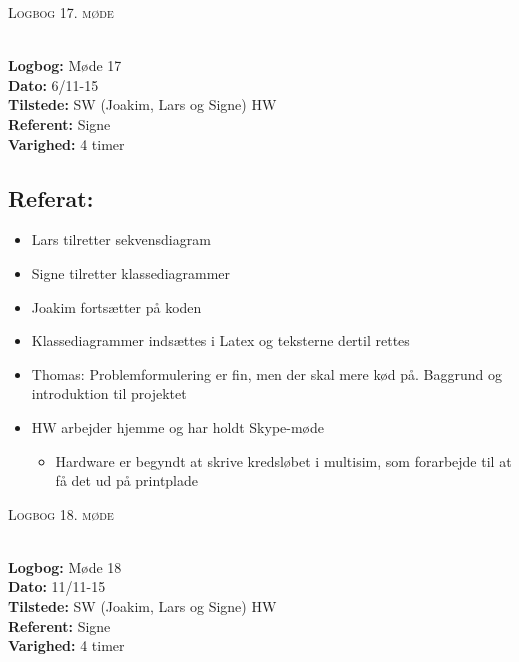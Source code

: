 \documentclass[a4paper,11pt,oneside]{memoir}
\begin{document}
\newpage


\begin{center} 
\huge{\textsc{Logbog 17. møde}}
\end{center}

\textbf{ }
\\
\textbf{Logbog:} Møde 17
\\
\textbf{Dato:} 6/11-15
\\
\textbf{Tilstede:} SW (Joakim, Lars og Signe) HW
\\
\textbf{Referent:} Signe
\\
\textbf{Varighed:} 4 timer
\\

\subsection{Referat:}
\begin{itemize}
\item Lars tilretter sekvensdiagram
\item Signe tilretter klassediagrammer
\item Joakim fortsætter på koden
\item Klassediagrammer indsættes i Latex og teksterne dertil rettes
\item Thomas: Problemformulering er fin, men der skal mere kød på. Baggrund og introduktion til projektet
\item HW arbejder hjemme og har holdt Skype-møde
\begin{itemize}
\item Hardware er begyndt at skrive kredsløbet i multisim, som forarbejde til at få det ud på printplade
\end{itemize}
\end{itemize}

\newpage


\begin{center} 
\huge{\textsc{Logbog 18. møde}}
\end{center}

\textbf{ }
\\
\textbf{Logbog:} Møde 18
\\
\textbf{Dato:} 11/11-15
\\
\textbf{Tilstede:} SW (Joakim, Lars og Signe) HW
\\
\textbf{Referent:} Signe
\\
\textbf{Varighed:} 4 timer
\\
\end{document}
